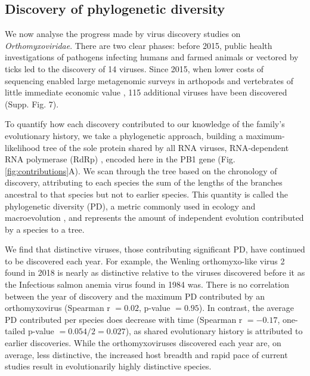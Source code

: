 \documentclass[11pt,twocolumn]{article}
\begin{document}
\begin{figure}
\end{figure}


\subsection{Discovery of phylogenetic diversity}

We now analyse the progress made by virus discovery studies on \textit{Orthomyxoviridae}. There are two clear phases: before 2015, public health investigations of pathogens infecting humans and farmed animals or vectored by ticks led to the discovery of 14 viruses. Since 2015, when lower costs of sequencing enabled large metagenomic surveys in arthopods and vertebrates of little immediate economic value \citep{li_unprecedented_2015, shi_evolutionary_2018}, 115 additional viruses have been discovered (Supp. Fig. 7).

To quantify how each discovery contributed to our knowledge of the family's evolutionary history, we take a phylogenetic approach, building a maximum-likelihood tree of the sole protein shared by all RNA viruses, RNA-dependent RNA polymerase (RdRp) \citep{koonin_virus_2014}, encoded here in the PB1 gene \citep{kobayashi_influenza_1996} (Fig. \ref{fig:contributions}A). We scan through the tree based on the chronology of discovery, attributing to each species the sum of the lengths of the branches ancestral to that species but not to earlier species. This quantity is called the phylogenetic diversity (PD), a metric commonly used in ecology and macroevolution \citep{lum_tracking_2022}, and represents the amount of independent evolution \citep{felsenstein_phylogenies_1985} contributed by a species to a tree.

We find that distinctive viruses, those contributing significant PD, have continued to be discovered each year. For example, the Wenling orthomyxo-like virus 2 found in 2018 is nearly as distinctive relative to the viruses discovered before it as the Infectious salmon anemia virus found in 1984 was. There is no correlation between the year of discovery and the maximum PD contributed by an orthomyxovirus (Spearman r $ = 0.02$, p-value $ = 0.95$). In contrast, the average PD contributed per species does decrease with time (Spearman r $ = -0.17$, one-tailed p-value $ = 0.054/2=0.027$), as shared evolutionary history is attributed to earlier discoveries. While the orthomyxoviruses discovered each year are, on average, less distinctive, the increased host breadth and rapid pace of current studies result in evolutionarily highly distinctive species.
\end{document}
